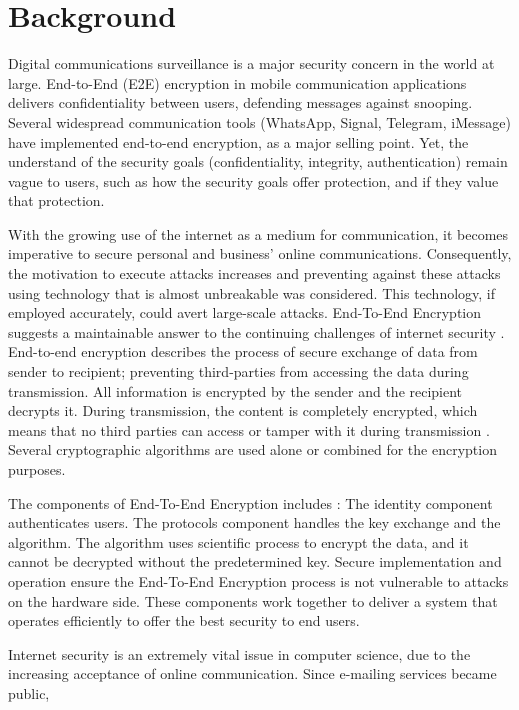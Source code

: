 \section{Background}\label{sec:bkgrnd}%
Digital communications surveillance is a major
security concern in the world at large. End-to-End (E2E)
encryption in mobile communication applications delivers
confidentiality between users, defending messages against
snooping. Several widespread communication tools
(WhatsApp, Signal, Telegram, iMessage) have implemented
end-to-end encryption, as a major selling point. Yet, the
understand of the security goals (confidentiality, integrity,
authentication) remain vague to users, such as how the
security goals offer protection, and if they value that
protection.\par
With the growing use of the internet as a medium for
communication, it becomes imperative to secure personal
and business’ online communications. Consequently, the
motivation to execute attacks increases and preventing
against these attacks using technology that is almost
unbreakable was considered. This technology, if employed
accurately, could avert large-scale attacks. End-To-End
Encryption suggests a maintainable answer to the continuing
challenges of internet security . End-to-end encryption
describes the process of secure exchange of data from
sender to recipient; preventing third-parties from accessing
the data during transmission. All information is encrypted by
the sender and the recipient decrypts it. During
transmission, the content is completely encrypted, which
means that no third parties can access or tamper with it
during transmission . Several cryptographic algorithms
are used alone or combined for the encryption purposes.\par
The components of End-To-End Encryption includes :
The identity component authenticates users. The protocols
component handles the key exchange and the algorithm. The
algorithm uses scientific process to encrypt the data, and it
cannot be decrypted without the predetermined key. Secure
implementation and operation ensure the End-To-End
Encryption process is not vulnerable to attacks on the
hardware side. These components work together to deliver a
system that operates efficiently to offer the best security to
end users.\par
Internet security is an extremely vital issue in computer
science, due to the increasing acceptance of online
communication. Since e-mailing services became public,
